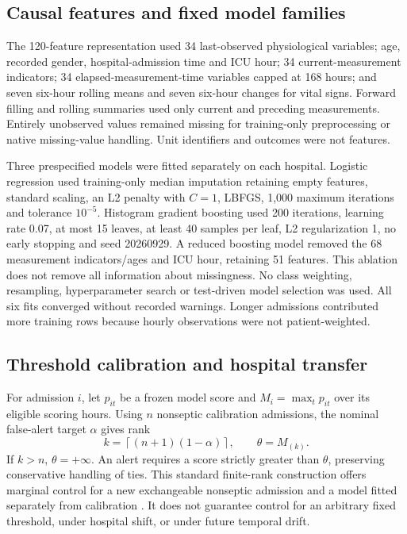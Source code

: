 \documentclass[11pt,a4paper]{article}
\begin{document}
\subsection{Causal features and fixed model families}
The 120-feature representation used 34 last-observed physiological variables; age, recorded gender, hospital-admission time and ICU hour; 34 current-measurement indicators; 34 elapsed-measurement-time variables capped at 168 hours; and seven six-hour rolling means and seven six-hour changes for vital signs. Forward filling and rolling summaries used only current and preceding measurements. Entirely unobserved values remained missing for training-only preprocessing or native missing-value handling. Unit identifiers and outcomes were not features.

Three prespecified models were fitted separately on each hospital. Logistic regression used training-only median imputation retaining empty features, standard scaling, an L2 penalty with $C=1$, LBFGS, 1,000 maximum iterations and tolerance $10^{-5}$. Histogram gradient boosting used 200 iterations, learning rate 0.07, at most 15 leaves, at least 40 samples per leaf, L2 regularization 1, no early stopping and seed 20260929. A reduced boosting model removed the 68 measurement indicators/ages and ICU hour, retaining 51 features. This ablation does not remove all information about missingness. No class weighting, resampling, hyperparameter search or test-driven model selection was used. All six fits converged without recorded warnings. Longer admissions contributed more training rows because hourly observations were not patient-weighted.

\subsection{Threshold calibration and hospital transfer}
For admission $i$, let $p_{it}$ be a frozen model score and $M_i=\max_t p_{it}$ over its eligible scoring hours. Using $n$ nonseptic calibration admissions, the nominal false-alert target $\alpha$ gives rank
\[
k=\left\lceil(n+1)(1-\alpha)\right\rceil,\qquad
\theta=M_{(k)}.
\]
If $k>n$, $\theta=+\infty$. An alert requires a score strictly greater than $\theta$, preserving conservative handling of ties. This standard finite-rank construction offers marginal control for a new exchangeable nonseptic admission and a model fitted separately from calibration \cite{angelopoulos}. It does not guarantee control for an arbitrary fixed threshold, under hospital shift, or under future temporal drift.
\end{document}
